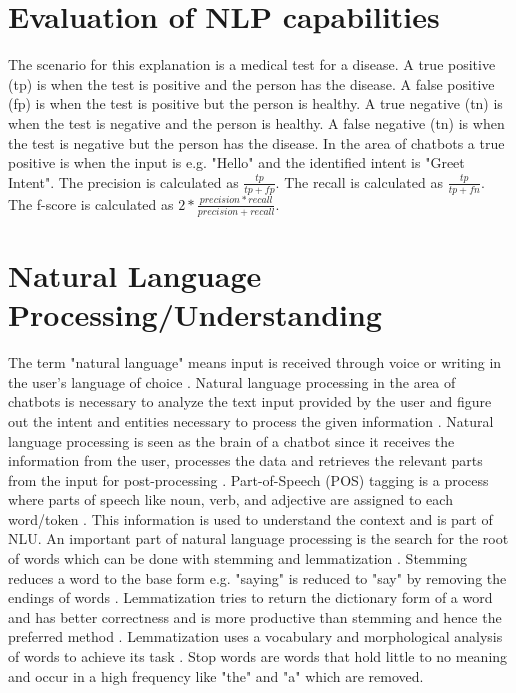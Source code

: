 \section{Evaluation of NLP capabilities}
The scenario for this explanation is a medical test for a disease.
A true positive (tp) is when the test is positive and the person has the disease.
A false positive (fp) is when the test is positive but the person is healthy.
A true negative (tn) is when the test is negative and the person is healthy.
A false negative (tn) is when the test is negative but the person has the disease.
In the area of chatbots a true positive is when the input is e.g. "Hello" and the identified 
intent is "Greet Intent".
The precision is calculated as $\frac{tp}{tp + fp}$.
The recall is calculated as $\frac{tp}{tp + fn}$.
The f-score is calculated as $2 * \frac{precision * recall}{precision + recall}$.

\section{Natural Language Processing/Understanding}   
The term "natural language" means input is received through voice or writing in the user's language of choice \cite{buiildChatbotsPython}.
Natural language processing in the area of chatbots is necessary to analyze the text input 
provided by the user and figure out the intent and entities necessary to process the given information \cite{buiildChatbotsPython}. 
Natural language processing is seen as the brain of a chatbot since it receives the information 
from the user, processes the data and retrieves the relevant parts from the input for post-processing \cite{buiildChatbotsPython}.
Part-of-Speech (POS) tagging is a process where parts of
speech like noun, verb, and adjective are assigned to each word/token \cite{buiildChatbotsPython}.
This information is used to understand the context and is part of NLU.
An important part of natural language processing is the search for the root of words which can be done with 
stemming and lemmatization \cite{buiildChatbotsPython}.
Stemming reduces a word to the base form e.g. "saying" is reduced to "say" by removing the endings of words \cite{buiildChatbotsPython}.
Lemmatization tries to return the dictionary form of a word and has better correctness and is more
 productive than stemming and hence the preferred method \cite{buiildChatbotsPython}. 
 Lemmatization uses a vocabulary and morphological analysis of words to achieve its task \cite{buiildChatbotsPython}.
Stop words are words that hold little to no meaning and occur in a high frequency like "the" and "a" which 
are removed.




